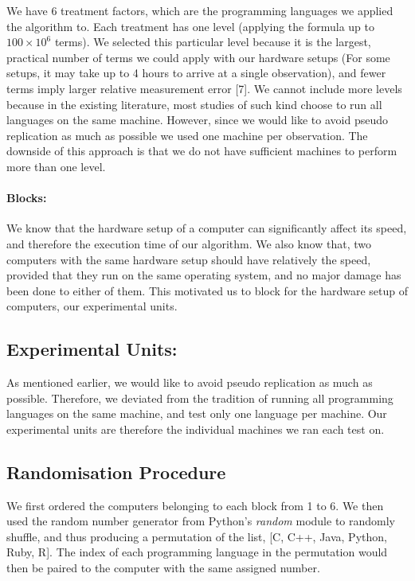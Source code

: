 \documentclass[12pt,halfline,a4paper,]{ouparticle}
\begin{document}
We have 6 treatment factors, which are the programming languages we
applied the algorithm to. Each treatment has one level (applying the
formula up to \(100 \times 10^6\) terms). We selected this particular
level because it is the largest, practical number of terms we could
apply with our hardware setups (For some setups, it may take up to 4
hours to arrive at a single observation), and fewer terms imply larger
relative measurement error {[}7{]}. We cannot include more levels
because in the existing literature, most studies of such kind choose to
run all languages on the same machine. However, since we would like to
avoid pseudo replication as much as possible we used one machine per
observation. The downside of this approach is that we do not have
sufficient machines to perform more than one level.

\hypertarget{blocks}{%
\paragraph{Blocks:}\label{blocks}}

We know that the hardware setup of a computer can significantly affect
its speed, and therefore the execution time of our algorithm. We also
know that, two computers with the same hardware setup should have
relatively the speed, provided that they run on the same operating
system, and no major damage has been done to either of them. This
motivated us to block for the hardware setup of computers, our
experimental units.

\hypertarget{experimental-units}{%
\subsection{Experimental Units:}\label{experimental-units}}

As mentioned earlier, we would like to avoid pseudo replication as much
as possible. Therefore, we deviated from the tradition of running all
programming languages on the same machine, and test only one language
per machine. Our experimental units are therefore the individual
machines we ran each test on.

\hypertarget{randomisation-procedure}{%
\subsection{Randomisation Procedure}\label{randomisation-procedure}}

We first ordered the computers belonging to each block from 1 to 6. We
then used the random number generator from Python's \emph{random} module
to randomly shuffle, and thus producing a permutation of the list, {[}C,
C++, Java, Python, Ruby, R{]}. The index of each programming language in
the permutation would then be paired to the computer with the same
assigned number.
\end{document}
